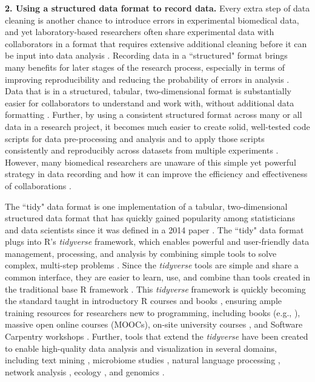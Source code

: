 \documentclass[pdftex,english,11pt,parskip=half]{scrartcl}
\begin{document}
\textbf{2. Using a structured data format to record data.} Every extra step of data
cleaning is another chance to introduce errors in experimental biomedical data, and yet laboratory-based researchers often share experimental data with collaborators in a format that requires extensive additional cleaning before it can be input into data analysis \cite{broman2018data}. Recording data in a ``structured" format brings many benefits for later stages of the research process, especially in terms of improving reproducibility and reducing the probability of errors in analysis \cite{ellis2018share}. Data that is in a structured, tabular, two-dimensional format is substantially easier for collaborators to understand and work with, without additional data formatting \cite{broman2018data}. Further, by using a consistent structured format across many or all data in a research project, it becomes much easier to create solid, well-tested code scripts for data pre-processing and analysis and to apply those scripts consistently and reproducibly across datasets from multiple experiments \cite{broman2018data}. However, many biomedical researchers are unaware of this simple yet powerful strategy in data recording and how it can improve the efficiency and effectiveness of collaborations \cite{ellis2018share}. 

The ``tidy" data format is one implementation of a tabular, two-dimensional structured data format that has quickly gained popularity among statisticians and data scientists since it was defined in a 2014 paper \cite{wickham2014tidy}. The ``tidy" data
format plugs into R's \textit{tidyverse} framework, which enables powerful and
user-friendly data management, processing, and analysis by combining simple
tools to solve complex, multi-step problems
\cite{ross2017declutter, silge2016tidytext, wickham2016ggplot2, wickham2016r}. Since the \textit{tidyverse} tools are simple and share a
common interface, they are easier to learn, use, and combine than tools created
in the traditional base R framework \cite{ross2017declutter, lowndes2017our,
reviewer2017review, mcnamara2016state}. This \textit{tidyverse} framework is
quickly becoming the standard taught in introductory R courses and books
\cite{hicks2017guide, baumer2015data, kaplan2018teaching, stander2017enthusing,
reviewer2017review, mcnamara2016state}, ensuring ample training resources for
researchers new to programming, including books (e.g., \cite{baumer2017modern,
lifesciencesR, wickham2016r}),
massive open online courses (MOOCs), on-site university courses
\cite{baumer2015data, kaplan2018teaching, stander2017enthusing}, and Software
Carpentry workshops \cite{wilson2014software, pawlik2017developing}. Further,
tools that extend the \textit{tidyverse} have been created to enable high-quality data
analysis and visualization in several domains, including text mining
\cite{silge2017text}, microbiome studies \cite{mcmurdie2013phyloseq}, natural
language processing \cite{RJ-2017-035}, network analysis \cite{RJ-2017-023},
ecology \cite{hsieh2016inext}, and genomics \cite{yin2012ggbio}. 
\end{document}
